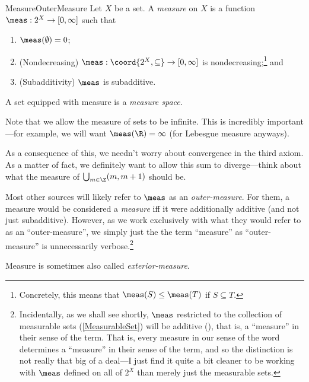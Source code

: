 \begin{dfn}{Measure}{OuterMeasure}
Let $X$ be a set.  A \emph{measure} on $X$ is a function $\meas :2^X\rightarrow [0,\infty ]$ such that
\begin{enumerate}
\item $\meas (\emptyset )=0$;
\item (Nondecreasing)\label{Measure.Monotonicity} $\meas :\coord{2^X,\subseteq}\rightarrow [0,\infty ]$ is nondecreasing;\footnote{Concretely, this means that $\meas (S)\leq \meas (T)$ if $S\subseteq T$.} and
\item (Subadditivity) $\meas$ is subadditive.
\end{enumerate}
A set equipped with measure is a \emph{measure space}.
\begin{rmk}
Note that we allow the measure of sets to be infinite.  This is incredibly important---for example, we will want $\meas (\R )=\infty$ (for Lebesgue measure anyways).
\end{rmk}
\begin{rmk}
As a consequence of this, we needn't worry about convergence in the third axiom.  As a matter of fact, we definitely want to allow this sum to diverge---think about what the measure of $\bigcup _{m\in \Z}(m,m+1)$ should be.
\end{rmk}
\begin{rmk}
Most other sources will likely refer to $\meas$ as an \emph{outer-measure}.  For them, a measure would be considered a \emph{measure} iff it were additionally additive (and not just subadditive).  However, as we work exclusively with what they would refer to as an ``outer-measure'', we simply just the the term ``measure'' as ``outer-measure'' is unnecessarily verbose.\footnote{Incidentally, as we shall see shortly, $\meas$ restricted to the collection of measurable sets (\cref{MeasurableSet}) will be additive (), that is, a ``measure'' in their sense of the term.  That is, every measure in our sense of the word determines a ``measure'' in their sense of the term, and so the distinction is not really that big of a deal---I just find it quite a bit cleaner to be working with $\meas$ defined on all of $2^X$ than merely just the measurable sets.}
\end{rmk}
\begin{rmk}
Measure is sometimes also called \emph{exterior-measure}.
\end{rmk}
\end{dfn}
